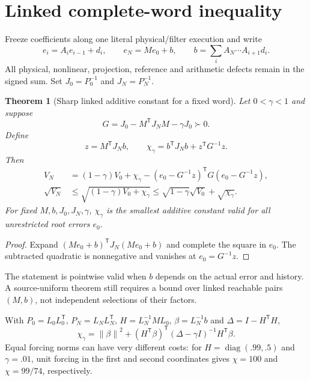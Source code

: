 \documentclass[11pt]{article}
\newtheorem{theorem}{Theorem}
\newcommand{\norm}[1]{\left\lVert#1\right\rVert}
\begin{document}
\section{Linked complete-word inequality}
Freeze coefficients along one literal physical/filter execution and write
\[
 e_i=A_i e_{i-1}+d_i,\qquad
 e_N=M e_0+b,\qquad
 b=\sum_i A_N\cdots A_{i+1}d_i .
\]
All physical, nonlinear, projection, reference and arithmetic defects remain
in the signed sum. Set $J_0=P_0^{-1}$ and $J_N=P_N^{-1}$.
\begin{theorem}[Sharp linked additive constant for a fixed word]
Let $0<\gamma<1$ and suppose
\[
 G=J_0-M^{\mathsf T}J_NM-\gamma J_0\succ0.
\]
Define
\[
 z=M^{\mathsf T}J_Nb,\qquad
 \chi_\gamma=b^{\mathsf T}J_Nb+z^{\mathsf T}G^{-1}z.
\]
Then
\begin{align*}
 V_N&=(1-\gamma)V_0+\chi_\gamma
 -(e_0-G^{-1}z)^{\mathsf T}G(e_0-G^{-1}z),\\
 \sqrt{V_N}&\le\sqrt{(1-\gamma)V_0+\chi_\gamma}
 \le\sqrt{1-\gamma}\sqrt{V_0}+\sqrt{\chi_\gamma}.
\end{align*}
For fixed $M,b,J_0,J_N,\gamma$, $\chi_\gamma$ is the smallest additive
constant valid for all unrestricted root errors $e_0$.
\end{theorem}
\begin{proof}
Expand $(Me_0+b)^{\mathsf T}J_N(Me_0+b)$ and complete the square in $e_0$.
The subtracted quadratic is nonnegative and vanishes at $e_0=G^{-1}z$.
\end{proof}
The statement is pointwise valid when $b$ depends on the actual error and
history. A source-uniform theorem still requires a bound over linked
reachable pairs $(M,b)$, not independent selections of their factors.

With $P_0=L_0L_0^{\mathsf T}$, $P_N=L_NL_N^{\mathsf T}$,
$H=L_N^{-1}ML_0$, $\beta=L_N^{-1}b$ and $\Delta=I-H^{\mathsf T}H$,
\[
 \chi_\gamma=\norm\beta^2+
 (H^{\mathsf T}\beta)^{\mathsf T}(\Delta-\gamma I)^{-1}
 H^{\mathsf T}\beta.
\]
Equal forcing norms can have very different costs: for
$H=\operatorname{diag}(.99,.5)$ and $\gamma=.01$, unit forcing in the first
and second coordinates gives $\chi=100$ and $\chi=99/74$, respectively.
\end{document}
